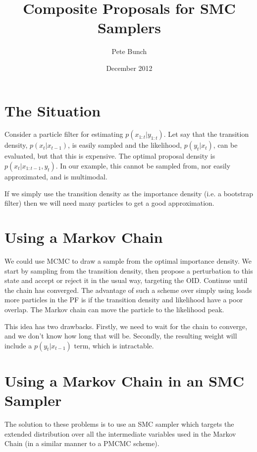 \documentclass{article}
\title{Composite Proposals for SMC Samplers}
\author{Pete Bunch}
\date{December 2012}
\begin{document}
\maketitle

\section{The Situation}

Consider a particle filter for estimating $p(x_{1:t} | y_{1:t})$. Let say that the transition density, $p(x_t | x_{t-1})$, is easily sampled and the likelihood, $p(y_t | x_t)$, can be evaluated, but that this is expensive. The optimal proposal density is $p(x_t | x_{1:t-1}, y_t)$. In our example, this cannot be sampled from, nor easily approximated, and is multimodal.

If we simply use the transition density as the importance density (i.e. a bootstrap filter) then we will need many particles to get a good approximation.



\section{Using a Markov Chain}

We could use MCMC to draw a sample from the optimal importance density. We start by sampling from the transition density, then propose a perturbation to this state and accept or reject it in the usual way, targeting the OID. Continue until the chain has converged. The advantage of such a scheme over simply using loads more particles in the PF is if the transition density and likelihood have a poor overlap. The Markov chain can move the particle to the likelihood peak.

This idea has two drawbacks. Firstly, we need to wait for the chain to converge, and we don't know how long that will be. Secondly, the resulting weight will include a $p(y_t | x_{t-1})$ term, which is intractable.



\section{Using a Markov Chain in an SMC Sampler}

The solution to these problems is to use an SMC sampler which targets the extended distribution over all the intermediate variables used in the Markov Chain (in a similar manner to a PMCMC scheme).
\end{document}
